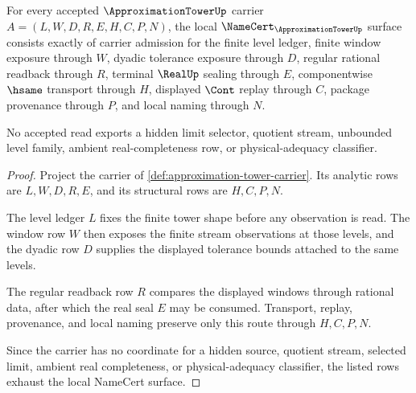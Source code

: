 \begin{theorem}
\label{thm:approximation-tower-finite-namecert-surface}
For every accepted $\ApproximationTowerUp$ carrier $A=(L,W,D,R,E,H,C,P,N)$, the local $\NameCert_{\ApproximationTowerUp}$ surface consists exactly of carrier admission for the finite level ledger, finite window exposure through $W$, dyadic tolerance exposure through $D$, regular rational readback through $R$, terminal $\RealUp$ sealing through $E$, componentwise $\hsame$ transport through $H$, displayed $\Cont$ replay through $C$, package provenance through $P$, and local naming through $N$.

No accepted read exports a hidden limit selector, quotient stream, unbounded level family, ambient real-completeness row, or physical-adequacy classifier.
\end{theorem}
\begin{proof}
Project the carrier of \autoref{def:approximation-tower-carrier}. Its analytic rows are $L,W,D,R,E$, and its structural rows are $H,C,P,N$.

The level ledger $L$ fixes the finite tower shape before any observation is read. The window row $W$ then exposes the finite stream observations at those levels, and the dyadic row $D$ supplies the displayed tolerance bounds attached to the same levels.

The regular readback row $R$ compares the displayed windows through rational data, after which the real seal $E$ may be consumed. Transport, replay, provenance, and local naming preserve only this route through $H,C,P,N$.

Since the carrier has no coordinate for a hidden source, quotient stream, selected limit, ambient real completeness, or physical-adequacy classifier, the listed rows exhaust the local NameCert surface.
\end{proof}

